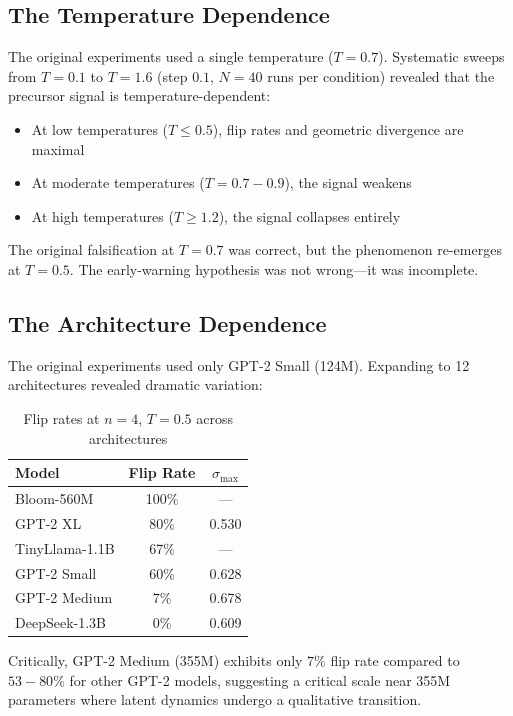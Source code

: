 \documentclass[12pt,a4paper]{article}
\begin{document}
\subsection{The Temperature Dependence}

The original experiments used a single temperature ($T=0.7$). Systematic sweeps from $T=0.1$ to $T=1.6$ (step $0.1$, $N=40$ runs per condition) revealed that the precursor signal is temperature-dependent:

\begin{itemize}
    \item At low temperatures ($T \leq 0.5$), flip rates and geometric divergence are maximal
    \item At moderate temperatures ($T = 0.7-0.9$), the signal weakens
    \item At high temperatures ($T \geq 1.2$), the signal collapses entirely
\end{itemize}

The original falsification at $T=0.7$ was correct, but the phenomenon re-emerges at $T=0.5$. The early-warning hypothesis was not wrong---it was incomplete.

\subsection{The Architecture Dependence}

The original experiments used only GPT-2 Small (124M). Expanding to 12 architectures revealed dramatic variation:

\begin{table}[H]
\centering
\caption{Flip rates at $n=4$, $T=0.5$ across architectures}
\label{tab:addendum_ranking}
\begin{tabular}{lcc}
\toprule
Model & Flip Rate & $\sigma_{\max}$ \\
\midrule
Bloom-560M & 100\% & --- \\
GPT-2 XL & 80\% & 0.530 \\
TinyLlama-1.1B & 67\% & --- \\
GPT-2 Small & 60\% & 0.628 \\
GPT-2 Medium & 7\% & 0.678 \\
DeepSeek-1.3B & 0\% & 0.609 \\
\bottomrule
\end{tabular}
\end{table}

Critically, GPT-2 Medium (355M) exhibits only $7\%$ flip rate compared to $53-80\%$ for other GPT-2 models, suggesting a critical scale near 355M parameters where latent dynamics undergo a qualitative transition.
\end{document}
